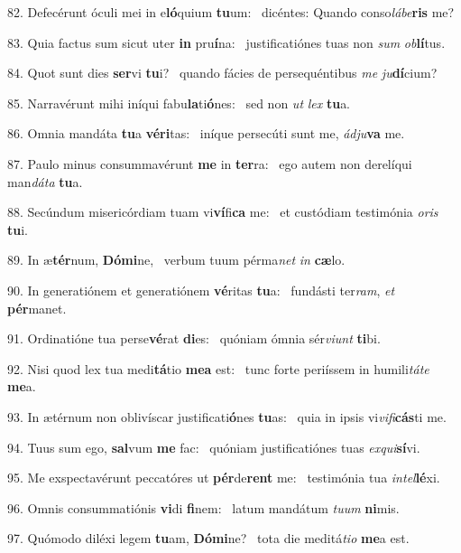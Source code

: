 82. Defecérunt óculi mei in e\textbf{ló}quium \textbf{tu}um: \ast\  dicéntes: Quando conso\textit{lá}\textit{be}\textbf{ris} me?\

83. Quia factus sum sicut uter \textbf{in} pru\textbf{í}na: \ast\  justificatiónes tuas non \textit{sum} \textit{ob}\textbf{lí}tus.\

84. Quot sunt dies \textbf{ser}vi \textbf{tu}i? \ast\  quando fácies de persequéntibus \textit{me} \textit{ju}\textbf{dí}cium?\

85. Narravérunt mihi iníqui fabu\textbf{la}ti\textbf{ó}nes: \ast\  sed non \textit{ut} \textit{lex} \textbf{tu}a.\

86. Omnia mandáta \textbf{tu}a \textbf{vé}\textbf{ri}tas: \ast\  iníque persecúti sunt me, \textit{ád}\textit{ju}\textbf{va} me.\

87. Paulo minus consummavérunt \textbf{me} in \textbf{ter}ra: \ast\  ego autem non derelíqui man\textit{dá}\textit{ta} \textbf{tu}a.\

88. Secúndum misericórdiam tuam vi\textbf{ví}fi\textbf{ca} me: \ast\  et custódiam testimónia \textit{o}\textit{ris} \textbf{tu}i.\

89. In æ\textbf{tér}num, \textbf{Dó}\textbf{mi}ne, \ast\  verbum tuum pérma\textit{net} \textit{in} \textbf{cæ}lo.\

90. In generatiónem et generatiónem \textbf{vé}ritas \textbf{tu}a: \ast\  fundásti ter\textit{ram}, \textit{et} \textbf{pér}manet.\

91. Ordinatióne tua perse\textbf{vé}rat \textbf{di}es: \ast\  quóniam ómnia sér\textit{vi}\textit{unt} \textbf{ti}bi.\

92. Nisi quod lex tua medi\textbf{tá}tio \textbf{me}\textbf{a} est: \ast\  tunc forte periíssem in humili\textit{tá}\textit{te} \textbf{me}a.\

93. In ætérnum non oblivíscar justificati\textbf{ó}nes \textbf{tu}as: \ast\  quia in ipsis vi\textit{vi}\textit{fi}\textbf{cás}ti me.\

94. Tuus sum ego, \textbf{sal}vum \textbf{me} fac: \ast\  quóniam justificatiónes tuas \textit{ex}\textit{qui}\textbf{sí}vi.\

95. Me exspectavérunt peccatóres ut \textbf{pér}de\textbf{rent} me: \ast\  testimónia tua \textit{in}\textit{tel}\textbf{lé}xi.\

96. Omnis consummatiónis \textbf{vi}di \textbf{fi}nem: \ast\  latum mandátum \textit{tu}\textit{um} \textbf{ni}mis.\

97. Quómodo diléxi legem \textbf{tu}am, \textbf{Dó}\textbf{mi}ne? \ast\  tota die meditá\textit{ti}\textit{o} \textbf{me}a est.\

